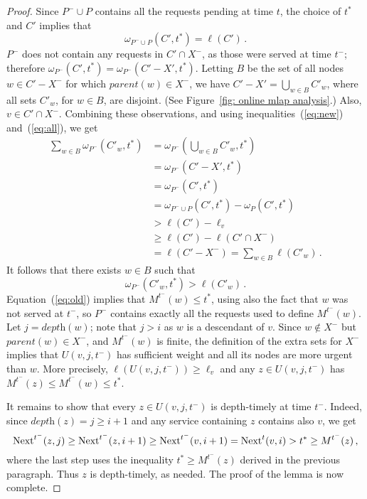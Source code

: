 \documentclass[a4paper]{article}
\newcommand{\length}{\ell}
\newcommand{\depth}{\textit{depth}}
\newcommand{\parent}{\textit{parent}}
\newcommand{\vertmaturity}{M}
\newcommand{\nxt}[3]{\mbox{\rm Next}^#1(#2,#3)}
\newcommand{\matvt}{{t^\ast}}
\begin{document}
\begin{proof}
Since $P^-\cup P$ contains all the requests pending at time $t$,
the choice of $\matvt$ and $C'$ implies that
\begin{equation}
\label{eq:all}  
\omega_{P^-\cup P}(C',\matvt)=\length(C')\,.
\end{equation}
$P^-$ does not contain any requests in $C'\cap X^-$, as those were served at time $t^-$;
therefore $\omega_{P^-}(C',\matvt) = \omega_{P^-}(C'-X',\matvt)$.
Letting $B$ be the set of all nodes $w\in C'-X^-$ for which $\parent(w)\in X^-$,
we have $C' - X' = \bigcup_{w\in B}C'_w$, where all sets $C'_w$, for $w\in B$,
are disjoint. (See Figure~\ref{fig: online mlap analysis}.)
Also, $v\in C'\cap X^-$. Combining these observations, and
using inequalities~(\ref{eq:new}) and~(\ref{eq:all}), we get
\begin{align*}
\textstyle \sum_{w\in B}\omega_{P^-}(C'_w, \matvt)
		&= \textstyle \omega_{P^-}(\bigcup_{w\in B}C'_w, \matvt)
\\
		&= \omega_{P^-}(C'-X',\matvt)
\\
		&= \omega_{P^-}(C', \matvt)
\\
		&= \omega_{P^-\cup P}(C',\matvt)-\omega_{P}(C',\matvt)
\\
		&> \length(C')-\length_v 
\\
		&\ge \length(C')-\length(C'\cap X^-)
\\
		&= \length(C'-X^-)
			=\textstyle \sum_{w\in B}\length(C'_w)\,.
\end{align*}
It follows that there exists $w\in B$ such that 
\begin{equation}\label{eq:old}  
\omega_{P^-}(C'_w, \matvt)>\length(C'_w)\,.
\end{equation}
Equation~(\ref{eq:old}) implies that $\vertmaturity^{t^-}(w)\leq \matvt$, 
using also the fact that $w$ was not served at $t^-$, so
$P^-$ contains exactly all the requests used to define
$\vertmaturity^{t^-}(w)$.  Let $j = \depth(w)$; note that $j>i$ as $w$
is a descendant of $v$. Since $w\not\in X^-$ but $\parent(w)\in X^-$, and
$\vertmaturity^{t^-}(w)$ is finite, the definition of the extra sets for $X^-$
implies that $U(v,j,t^-)$ has sufficient weight and all its nodes
are more urgent than $w$. More precisely, $\length(U(v,j,t^-))\geq
\length_v$ and any $z\in U(v,j,t^-)$ has $\vertmaturity^{t^-}(z)\leq
\vertmaturity^{t^-}(w)\leq \matvt$. 


It remains to show that every $z\in U(v,j,t^-)$ is depth-timely at time $t^-$.
Indeed, since $\depth(z) = j \ge i+1$ and any service containing $z$ contains also $v$, we get
\begin{equation*}
\nxt{{t^-}}{z}{j}	\ge \nxt{{t^-}}{z}{i+1} 
					\ge \nxt{{t^-}}{v}{i+1}
					= \nxt{t}{v}{i} 
					> \matvt
					\geq \vertmaturity^{t^-}(z)\,,
\end{equation*}
where the last step uses the inequality $ \matvt \geq \vertmaturity^{t^-}(z)$
derived in the previous paragraph. Thus $z$ is depth-timely, as needed.
The proof of the lemma is now complete.
\end{proof}
\end{document}
